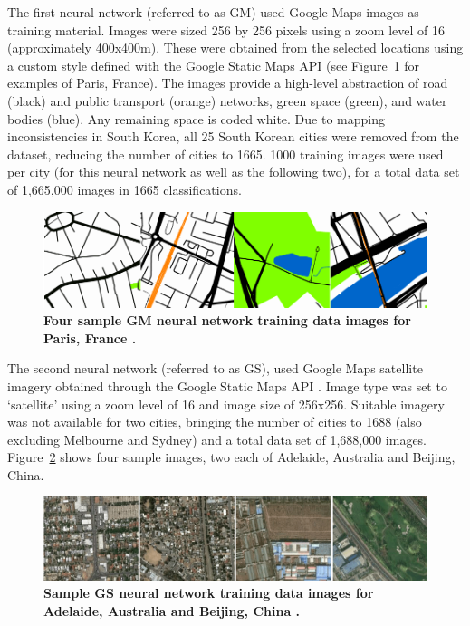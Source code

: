 \documentclass[Crown,sageh,times]{sagej}
\begin{document}
The first neural network (referred to as GM) used Google Maps images as training material. Images were sized 256 by 256 pixels using a zoom level of 16 (approximately 400x400m). These were obtained from the selected locations using a custom style defined with the Google Static Maps API \citep{GoogleStatic2017} (see Figure~\ref{fig:maps} for examples of Paris, France). The images provide a high-level abstraction of road (black) and public transport (orange) networks, green space (green), and water bodies (blue). Any remaining space is coded white. Due to mapping inconsistencies in South Korea, all 25 South Korean cities were removed from the dataset, reducing the number of cities to 1665. 1000 training images were used per city (for this neural network as well as the following two), for a total data set of 1,665,000 images in 1665 classifications. 



\begin{figure}[!htbp]
    \centering    
\includegraphics[scale=1]{Images/PlosOne/Fig2.png}  
\caption{\bf Four sample GM neural network training data images for Paris, France \citep{GoogleStatic2017}.}    
 \label{fig:maps}  
\end{figure} 


The second neural network (referred to as GS), used Google Maps satellite imagery obtained through the Google Static Maps API \citep{GoogleStatic2017}. Image type was set to `satellite' using a zoom level of 16 and image size of 256x256. Suitable imagery was not available for two cities, bringing the number of cities to 1688 (also excluding Melbourne and Sydney) and a total data set of 1,688,000 images. Figure~\ref{fig:satbeiade} shows four sample images, two each of Adelaide, Australia and Beijing, China. 




\begin{figure}[!htbp]
\centering 
\includegraphics[scale=1]{Images/PlosOne/Fig3.png}     
\caption{\bf Sample GS neural network training data images for Adelaide, Australia and Beijing, China \citep{GoogleStatic2017}.}    
 \label{fig:satbeiade}  
\end{figure} 
\end{document}

